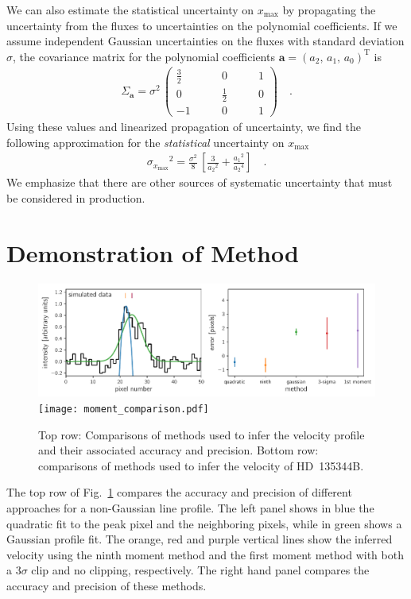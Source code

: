 \documentclass[rnaas]{aastex62}
\newcommand{\T}{\ensuremath{\mathrm{T}}}
\newcommand{\bvec}[1]{{\ensuremath{\boldsymbol{#1}}}}
\begin{document}
We can also estimate the statistical uncertainty on $x_\mathrm{max}$ by
propagating the uncertainty from the fluxes to uncertainties on the polynomial
coefficients.
If we assume independent Gaussian uncertainties on the fluxes with standard
deviation $\sigma$, the covariance matrix for the polynomial coefficients
$\bvec{a} = {(a_2,\,a_1,\,a_0)}^\T$ is
\begin{eqnarray}
\Sigma_\bvec{a} = \sigma^2\,\left(\begin{array}{ccc}
\frac{3}{2} \quad & \quad 0 \quad &\quad 1 \\
0\quad &\quad \frac{1}{2}\quad &\quad 0 \\
-1\quad &\quad 0\quad &\quad 1
\end{array}\right)\quad.
\end{eqnarray}
Using these values and linearized propagation of uncertainty, we find the
following approximation for the \emph{statistical} uncertainty on
$x_\mathrm{max}$
\begin{eqnarray}
{\sigma_{x_\mathrm{max}}}^2 = \frac{\sigma^2}{8}\,\left[
    \frac{3}{{a_2}^2} + \frac{{a_1}^2}{{a_2}^4}
\right]\quad.
\end{eqnarray}
We emphasize that there are other sources of systematic uncertainty that must
be considered in production.

\section{Demonstration of Method}

\begin{figure}[htbp]
\centering
\includegraphics[width=\textwidth]{../notebooks/simulated-spectrum.pdf}
\texttt{[image: moment\_comparison.pdf]}
\caption{Top row: Comparisons of methods used to infer the velocity profile and their associated accuracy and precision. Bottom row: comparisons of methods used to infer the velocity of HD~135344B. \label{figure}}
\end{figure}

The top row of Fig.~\ref{figure} compares the accuracy and precision of different approaches for a non-Gaussian line profile. The left panel shows in blue the quadratic fit to the peak pixel and the neighboring pixels, while in green shows a Gaussian profile fit. The orange, red and purple vertical lines show the inferred velocity using the ninth moment method and the first moment method with both a $3\sigma$ clip and no clipping, respectively. The right hand panel compares the accuracy and precision of these methods.
\end{document}
